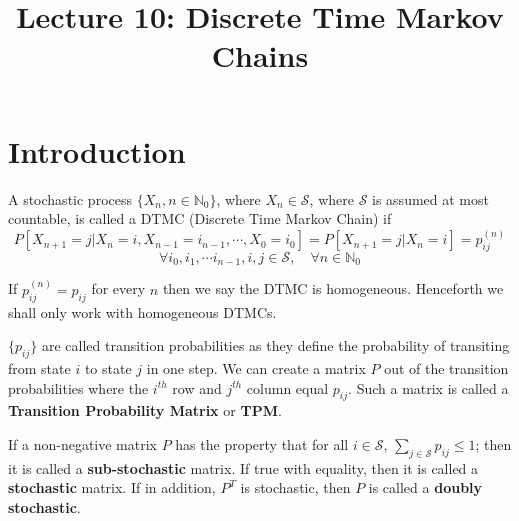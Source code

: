 \documentclass[a4paper,10pt]{article}
\title{ Lecture 10: Discrete Time Markov Chains}
\author{}
\begin{document}
\maketitle
\section{Introduction}
\begin{defn}[DTMC]
A stochastic process $\{X_n, n \in \mathbb{N}_0\}$, where $X_n \in \mathcal{S}$, where $\mathcal{S}$ is assumed at most countable, is called a DTMC (Discrete Time Markov Chain) if
\[P[X_{n+1} = j| X_n = i, X_{n-1} =i_{n-1}, \cdots, X_0 = i_0] = P[X_{n+1} = j|X_n = i] = p_{ij}^{(n)}\] 
\[\forall i_0, i_1,\cdots i_{n-1}, i,j \in \mathcal{S}, \quad \forall n \in \mathbb{N}_0\]
\end{defn}

If $p_{ij}^{(n)} = p_{ij}$ for every $n$ then we say the DTMC is homogeneous. Henceforth we shall only work with homogeneous DTMCs. 

\begin{defn}
  $\{p_{ij}\}$ are called transition probabilities as they define the
  probability of transiting from state $i$ to state $j$ in one step.
  We can create a matrix $P$ out of the transition probabilities where
  the $i^{th}$ row and $j^{th}$ column equal $p_{ij}$. Such a matrix
  is called a \textbf{Transition Probability Matrix} or \textbf{TPM}.
\end{defn}
If a non-negative matrix $P$ has the property that for all $i \in \mathcal{S}$, $\sum_{j \in \mathcal{S}} p_{ij} \leq 1$; then it is called a \textbf{sub-stochastic} matrix. If true with equality, then it is called a \textbf{stochastic} matrix. If in addition, $P^T$ is stochastic, then $P$ is called a \textbf{doubly stochastic}.


\end{document}
